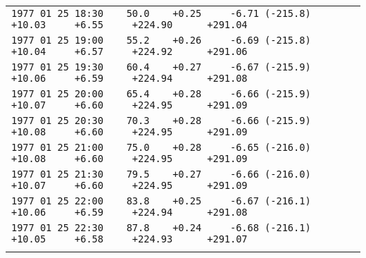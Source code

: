 \begin{tiny}
\begin{center}
\begin{tabular}{|l|}
\verb|1977 01 25 18:30    50.0    +0.25     -6.71 (-215.8)     +10.03     +6.55     +224.90      +291.04|\\
\verb|1977 01 25 19:00    55.2    +0.26     -6.69 (-215.8)     +10.04     +6.57     +224.92      +291.06|\\
\verb|1977 01 25 19:30    60.4    +0.27     -6.67 (-215.9)     +10.06     +6.59     +224.94      +291.08|\\
\verb|1977 01 25 20:00    65.4    +0.28     -6.66 (-215.9)     +10.07     +6.60     +224.95      +291.09|\\
\verb|1977 01 25 20:30    70.3    +0.28     -6.66 (-215.9)     +10.08     +6.60     +224.95      +291.09|\\
\verb|1977 01 25 21:00    75.0    +0.28     -6.65 (-216.0)     +10.08     +6.60     +224.95      +291.09|\\
\verb|1977 01 25 21:30    79.5    +0.27     -6.66 (-216.0)     +10.07     +6.60     +224.95      +291.09|\\
\verb|1977 01 25 22:00    83.8    +0.25     -6.67 (-216.1)     +10.06     +6.59     +224.94      +291.08|\\
\verb|1977 01 25 22:30    87.8    +0.24     -6.68 (-216.1)     +10.05     +6.58     +224.93      +291.07|\\
\\
\hline
\end{tabular}

\end{center}
\end{tiny}


